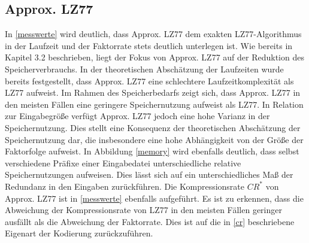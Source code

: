 \subsection{Approx. LZ77}
In \ref{messwerte} wird deutlich, dass Approx. LZ77 dem exakten LZ77-Algorithmus in der Laufzeit und der Faktorrate stets deutlich unterlegen ist. Wie bereits in Kapitel
3.2 beschrieben, liegt der Fokus von Approx. LZ77 auf der Reduktion des Speicherverbrauchs. In der theoretischen Abschätzung der Laufzeiten wurde bereits festgestellt,
dass Approx. LZ77 eine schlechtere Laufzeitkomplexität als LZ77 aufweist. Im Rahmen des Speicherbedarfs zeigt sich, dass Approx. LZ77 in den meisten Fällen eine geringere
Speichernutzung aufweist als LZ77. In Relation zur Eingabegröße verfügt Approx. LZ77 jedoch eine hohe Varianz in der Speichernutzung. Dies stellt eine Konsequenz der
theoretischen Abschätzung der Speichernutzung dar, die insbesondere eine hohe Abhängigkeit von der Größe der Faktorfolge aufweist. In Abbildung \ref{memory} wird 
ebenfalls deutlich, dass selbst verschiedene Präfixe einer Eingabedatei unterschiedliche relative Speichernutzungen aufweisen. Dies lässt sich auf ein 
unterschiedliches Maß der Redundanz in den Eingaben zurückführen. Die Kompressionsrate $CR^*$ von Approx. LZ77 ist in \ref{messwerte} ebenfalls aufgeführt. Es ist 
zu erkennen, dass die Abweichung der Kompressionsrate von LZ77 in den meisten Fällen geringer ausfällt als die Abweichung der Faktorrate. Dies ist auf die in 
\ref{cr} beschriebene Eigenart der Kodierung zurückzuführen.


